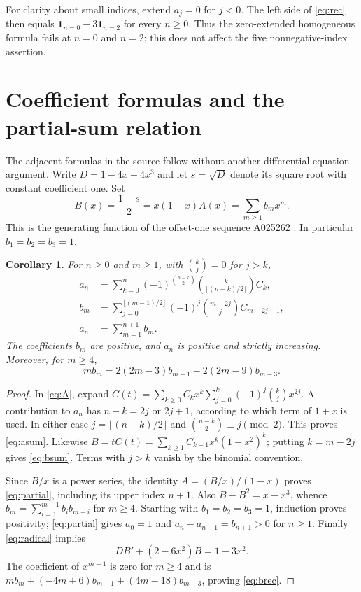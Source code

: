\documentclass[11pt]{article}
\newtheorem{corollary}[theorem]{Corollary}
\begin{document}
For clarity about small indices, extend $a_j=0$ for $j<0$.
The left side of \eqref{eq:rec} then equals
$\mathbf1_{n=0}-3\mathbf1_{n=2}$ for every $n\geq0$.
Thus the zero-extended homogeneous formula fails at $n=0$ and $n=2$;
this does not affect the five nonnegative-index assertion.

\section{Coefficient formulas and the partial-sum relation}

The adjacent formulas in the source follow without another differential
equation argument. Write $D=1-4x+4x^3$ and let $s=\sqrt D$
denote its square root with constant coefficient one. Set
\[
 B(x)=\frac{1-s}{2}=x(1-x)A(x)=\sum_{m\geq1}b_mx^m.
\]
This is the generating function of the offset-one sequence A025262
\cite{oeisb}. In particular $b_1=b_2=b_3=1$.

\begin{corollary}\label{cor:coeff}
For $n\geq0$ and $m\geq1$, with $\binom{k}{j}=0$ for $j>k$,
\begin{align}
 a_n&=\sum_{k=0}^n
 (-1)^{\binom{n-k}{2}}\binom{k}{\lfloor(n-k)/2\rfloor}C_k,
       \label{eq:asum}\\
 b_m&=\sum_{j=0}^{\lfloor(m-1)/2\rfloor}
 (-1)^j\binom{m-2j}{j}C_{m-2j-1},\label{eq:bsum}\\
 a_n&=\sum_{m=1}^{n+1}b_m.\label{eq:partial}
\end{align}
The coefficients $b_m$ are positive, and $a_n$ is positive and strictly
increasing. Moreover, for $m\geq4$,
\begin{equation}\label{eq:brec}
 m b_m=2(2m-3)b_{m-1}-2(2m-9)b_{m-3}.
\end{equation}
\end{corollary}

\begin{proof}
In \eqref{eq:A}, expand
$C(t)=\sum_{k\geq0}C_kx^k\sum_{j=0}^k(-1)^j\binom{k}{j}x^{2j}$.
A contribution to $a_n$ has $n-k=2j$ or $2j+1$, according to
which term of $1+x$ is used. In either case
$j=\lfloor(n-k)/2\rfloor$ and
$\binom{n-k}{2}\equiv j\pmod2$. This proves \eqref{eq:asum}.
Likewise $B=tC(t)=\sum_{k\geq1}C_{k-1}x^k(1-x^2)^k$;
putting $k=m-2j$ gives \eqref{eq:bsum}. Terms with $j>k$ vanish
by the binomial convention.

Since $B/x$ is a power series, the identity
$A=(B/x)/(1-x)$ proves \eqref{eq:partial}, including its upper
index $n+1$. Also $B-B^2=x-x^3$, whence
$b_m=\sum_{i=1}^{m-1}b_ib_{m-i}$ for $m\geq4$.
Starting with $b_1=b_2=b_3=1$, induction proves positivity;
\eqref{eq:partial} gives $a_0=1$ and
$a_n-a_{n-1}=b_{n+1}>0$ for $n\geq1$.
Finally \eqref{eq:radical} implies
\[
 D B'+(2-6x^2)B=1-3x^2.
\]
The coefficient of $x^{m-1}$ is zero for $m\geq4$ and is
$m b_m+(-4m+6)b_{m-1}+(4m-18)b_{m-3}$, proving
\eqref{eq:brec}.
\end{proof}
\end{document}
